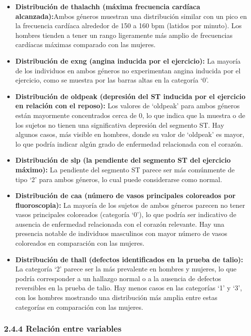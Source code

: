 \documentclass[
]{article}
\begin{document}
\begin{itemize}
\item
  \textbf{Distribución de thalachh (máxima frecuencia cardíaca
  alcanzada):}Ambos géneros muestran una distribución similar con un
  pico en la frecuencia cardíaca alrededor de 150 a 160 bpm (latidos por
  minuto). Los hombres tienden a tener un rango ligeramente más amplio
  de frecuencias cardíacas máximas comparado con las mujeres.
\item
  \textbf{Distribución de exng (angina inducida por el ejercicio):} La
  mayoría de los individuos en ambos géneros no experimentan angina
  inducida por el ejercicio, como se muestra por las barras altas en la
  categoría `0'.
\item
  \textbf{Distribución de oldpeak (depresión del ST inducida por el
  ejercicio en relación con el reposo):} Los valores de `oldpeak' para
  ambos géneros están mayormente concentrados cerca de 0, lo que indica
  que la muestra o de los sujetos no tienen una significativa depresión
  del segmento ST. Hay algunos casos, más visible en hombres, donde su
  valor de `oldpeak' es mayor, lo que podría indicar algún grado de
  enfermedad relacionada con el corazón.
\item
  \textbf{Distribución de slp (la pendiente del segmento ST del
  ejercicio máximo):} La pendiente del segmento ST parece ser más
  comúnmente de tipo `2' para ambos géneros, lo cual puede considerarse
  como normal.
\item
  \textbf{Distribución de caa (número de vasos principales coloreados
  por fluoroscopia):} La mayoría de los sujetos de ambos géneros parecen
  no tener vasos principales coloreados (categoría `0'), lo que podría
  ser indicativo de ausencia de enfermedad relacionada con el corazón
  relevante. Hay una presencia notable de individuos masculinos con
  mayor número de vasos coloreados en comparación con las mujeres.
\item
  \textbf{Distribución de thall (defectos identificados en la prueba de
  talio):} La categoría `2' parece ser la más prevalente en hombres y
  mujeres, lo que podría corresponder a un hallazgo normal o a la
  ausencia de defectos reversibles en la prueba de talio. Hay menos
  casos en las categorías `1' y `3', con los hombres mostrando una
  distribución más amplia entre estas categorías en comparación con las
  mujeres.
\end{itemize}

\hypertarget{relaciuxf3n-entre-variables}{%
\subsubsection{2.4.4 Relación entre
variables}\label{relaciuxf3n-entre-variables}}
\end{document}
